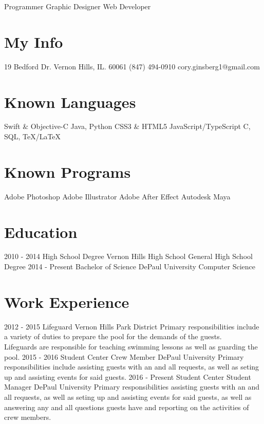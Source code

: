 \documentclass[]{resume-class}
\begin{document}
       {Programmer \textbullet \hspace{0.01cm} Graphic Designer \textbullet \hspace{0.01cm} Web Developer}


\begin{aside}
  \section{My Info}
    19 Bedford Dr.
    Vernon Hills, IL.
    60061
    (847) 494-0910
    cory.ginsberg1@gmail.com
  \section{Known Languages}
    Swift \& Objective-C
    Java, Python
    CSS3 \& HTML5
    JavaScript/TypeScript
    C, SQL, TeX/LaTeX
  \section{Known Programs}
    Adobe Photoshop
    Adobe Illustrator
    Adobe After Effect
    Autodesk Maya
\end{aside}

\section{Education}

\begin{entrylist}
  \entry
    {2010 - 2014}
    {High School Degree}
    {Vernon Hills High School}
    {General High School Degree}
  \entry
    {2014 - Present}
    {Bachelor of Science}
    {DePaul University}
    {Computer Science}
\end{entrylist}

\section{Work Experience}

\begin{entrylist}
  \entry
    {2012 - 2015}
    {Lifeguard}
    {Vernon Hills Park District}
    {Primary responsibilities include a variety of duties to prepare the pool for the demands of the guests.\\
Lifeguards are responsible for teaching swimming lessons as well as guarding the pool.}
  \entry
    {2015 - 2016}
    {Student Center Crew Member}
    {DePaul University}
    {Primary responsibilities include assisting guests with an and all requests, as well as seting up and assisting events for said guests.}
  \entry
    {2016 - Present}
    {Student Center Student Manager}
    {DePaul University}
    {Primary responsibilities assisting guests with an and all requests, as well as seting up and assisting events for said guests, as well as answering any and all questions guests have and reporting on the activities of crew members.}
\end{entrylist}
\end{document}
